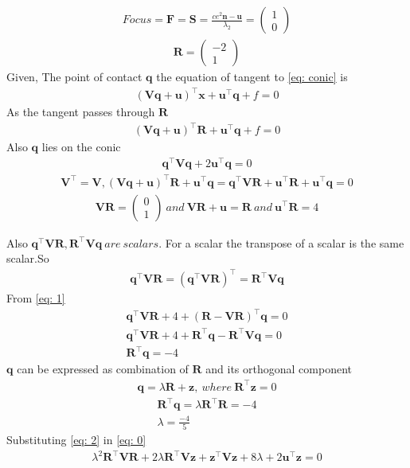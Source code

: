 \documentclass{beamer}
\providecommand{\brak}[1]{\ensuremath{\left(#1\right)}}
\theoremstyle{remark}
\newcommand{\myvec}[1]{\ensuremath{\begin{pmatrix}#1\end{pmatrix}}}
\let\vec\mathbf
\numberwithin{equation}{section}
\numberwithin{equation}{section}
\begin{document}
\begin{frame}
\begin{align}
Focus = \vec{F} = \vec{S} = \frac{ce^2\vec{n} - \vec{u}}{\lambda_2} = \myvec{1\\0}
\end{align}
\begin{align}
\vec{R} = \myvec{-2\\1}
\end{align}
Given, The point of contact $\vec{q}$ the equation of tangent to \eqref{eq: conic} is
\begin{align}
\brak{\vec{V}\vec{q}+\vec{u}}^\top\vec{x} + \vec{u}^\top\vec{q} + f = 0
\end{align}
As the tangent passes through $\vec{R}$
\begin{align}
\brak{\vec{V}\vec{q}+\vec{u}}^\top\vec{R} + \vec{u}^\top\vec{q} + f = 0
\end{align}
Also $\vec{q}$ lies on the conic
\begin{align}
\vec{q}^\top\vec{V}\vec{q} + 2\vec{u}^\top\vec{q} = 0 \label{eq: 0}
\end{align}
\begin{align}
\vec{V}^\top = \vec{V} , \brak{\vec{V}\vec{q}+\vec{u}}^\top\vec{R} + \vec{u}^\top\vec{q} = \vec{q}^\top\vec{V}\vec{R} + \vec{u}^\top\vec{R} + \vec{u}^\top\vec{q} = 0 \label{eq: 1}
\end{align}
\begin{align}
\vec{V}\vec{R} = \myvec{0\\1} \ and \ \vec{V}\vec{R} + \vec{u} = \vec{R} \ and \ \vec{u}^\top\vec{R} = 4
\end{align}
\end{frame}
\begin{frame}
Also
$
\vec{q}^\top\vec{V}\vec{R} , \vec{R}^\top\vec{V}\vec{q} \ are \ scalars.
$
For a scalar the transpose of a scalar is the same scalar.So
\begin{align}
\vec{q}^\top\vec{V}\vec{R} = \brak{\vec{q}^\top\vec{V}\vec{R}}^\top = \vec{R}^\top\vec{V}\vec{q}
\end{align}
From \eqref{eq: 1}
\begin{align}
\vec{q}^\top\vec{V}\vec{R} + 4 + \brak{\vec{R}-\vec{V}\vec{R}}^\top\vec{q} = 0 \\
\vec{q}^\top\vec{V}\vec{R} + 4 + \vec{R}^\top\vec{q} - \vec{R}^\top\vec{V}\vec{q} = 0 \\
\vec{R}^\top\vec{q} = -4
\end{align}
$\vec{q}$ can be expressed as combination of $\vec{R}$ and its orthogonal component
\begin{align}
\vec{q} = \lambda\vec{R} + \vec{z} , \ where \ \vec{R}^\top\vec{z} = 0 \label{eq: 2}
\end{align}
\begin{align}
\vec{R}^\top\vec{q} = \lambda\vec{R}^\top\vec{R} = -4 \\
\lambda = \frac{-4}{5}
\end{align}
Substituting \eqref{eq: 2} in \eqref{eq: 0}
\begin{align}
\lambda^2\vec{R}^\top\vec{V}\vec{R} + 2\lambda\vec{R}^\top\vec{V}\vec{z} + \vec{z}^\top\vec{V}\vec{z} + 8\lambda + 2\vec{u}^\top\vec{z} = 0
\end{align}
\end{frame}
\end{document}
